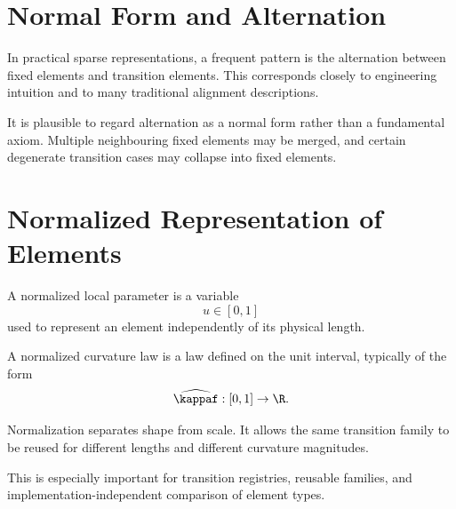 
\section{Normal Form and Alternation}

\begin{remark}
In practical sparse representations, a frequent pattern is the
alternation between fixed elements and transition elements. This
corresponds closely to engineering intuition and to many traditional
alignment descriptions.
\end{remark}


\begin{remark}
It is plausible to regard alternation as a normal form rather than a
fundamental axiom. Multiple neighbouring fixed elements may be merged,
and certain degenerate transition cases may collapse into fixed
elements.
\end{remark}

\section{Normalized Representation of Elements}

\begin{definition}
A normalized local parameter is a variable
\[
u\in[0,1]
\]
used to represent an element independently of its physical length.
\end{definition}

\begin{definition}
A normalized curvature law is a law defined on the unit interval,
typically of the form
\[
\widehat{\kappaf} : [0,1]\to\R.
\]
\end{definition}

\begin{remark}
Normalization separates shape from scale.
It allows the same transition family to be reused for different lengths
and different curvature magnitudes.
\end{remark}

\begin{remark}
This is especially important for transition registries, reusable
families, and implementation-independent comparison of element types.
\end{remark}


